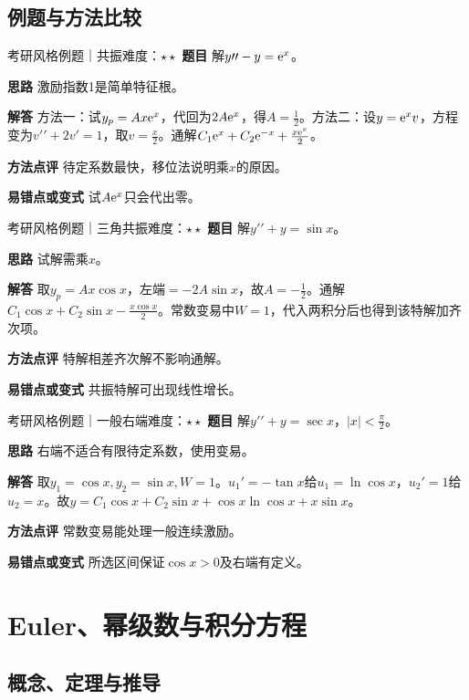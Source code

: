 \subsection{例题与方法比较}
\begin{example}{考研风格例题｜共振}{难度：$\star\star$}
\label{ex:4:10}\textbf{题目} 解$y\prime\prime-y=\mathrm{e}^x$。\par
\textbf{思路} 激励指数1是简单特征根。\par
\textbf{解答} 方法一：试$y_p=Ax\mathrm{e}^x$，代回为$2A\mathrm{e}^x$，得$A=\frac{1}{2}$。方法二：设$y=\mathrm{e}^xv$，方程变为$v\prime\prime+2v\prime=1$，取$v=\frac{x}{2}$。通解$C_1\mathrm{e}^x+C_2\mathrm{e}^{-x}+\frac{x\mathrm{e}^x}{2}$。\par
\textbf{方法点评} 待定系数最快，移位法说明乘$x$的原因。\par
\textbf{易错点或变式} 试$A\mathrm{e}^x$只会代出零。
\end{example}
\begin{example}{考研风格例题｜三角共振}{难度：$\star\star$}
\label{ex:4:11}\textbf{题目} 解$y\prime\prime+y=\sin x$。\par
\textbf{思路} 试解需乘$x$。\par
\textbf{解答} 取$y_p=Ax\cos x$，左端$=-2A\sin x$，故$A=-\frac{1}{2}$。通解$C_1\cos x+C_2\sin x-\frac{x\cos x}{2}$。常数变易中$W=1$，代入两积分后也得到该特解加齐次项。\par
\textbf{方法点评} 特解相差齐次解不影响通解。\par
\textbf{易错点或变式} 共振特解可出现线性增长。
\end{example}
\begin{example}{考研风格例题｜一般右端}{难度：$\star\star$}
\label{ex:4:12}\textbf{题目} 解$y\prime\prime+y=\sec x$，$|x|<\frac{\pi}{2}$。\par
\textbf{思路} 右端不适合有限待定系数，使用变易。\par
\textbf{解答} 取$y_1=\cos x,y_2=\sin x,W=1$。$u_1\prime=-\tan x$给$u_1=\ln\cos x$，$u_2\prime=1$给$u_2=x$。故$y=C_1\cos x+C_2\sin x+\cos x\ln\cos x+x\sin x$。\par
\textbf{方法点评} 常数变易能处理一般连续激励。\par
\textbf{易错点或变式} 所选区间保证$\cos x>0$及右端有定义。
\end{example}
\section{Euler、幂级数与积分方程}\label{sec:4:5}
\subsection{概念、定理与推导}

